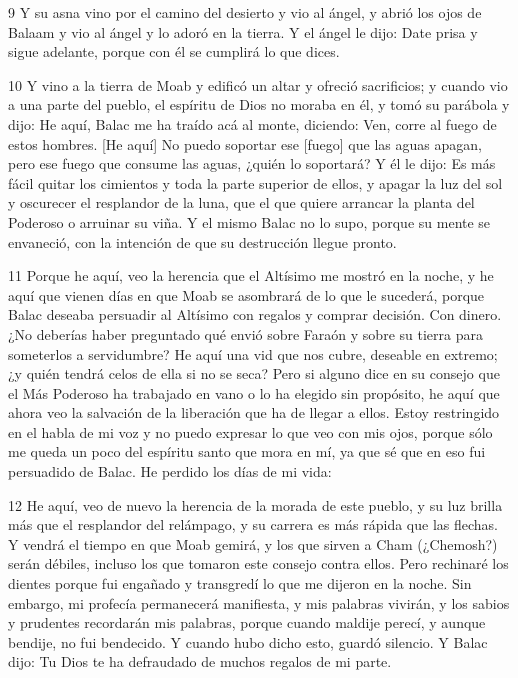\par 9 Y su asna vino por el camino del desierto y vio al ángel, y abrió los ojos de Balaam y vio al ángel y lo adoró en la tierra. Y el ángel le dijo: Date prisa y sigue adelante, porque con él se cumplirá lo que dices.

\par 10 Y vino a la tierra de Moab y edificó un altar y ofreció sacrificios; y cuando vio a una parte del pueblo, el espíritu de Dios no moraba en él, y tomó su parábola y dijo: He aquí, Balac me ha traído acá al monte, diciendo: Ven, corre al fuego de estos hombres. [He aquí] No puedo soportar ese [fuego] que las aguas apagan, pero ese fuego que consume las aguas, ¿quién lo soportará? Y él le dijo: Es más fácil quitar los cimientos y toda la parte superior de ellos, y apagar la luz del sol y oscurecer el resplandor de la luna, que el que quiere arrancar la planta del Poderoso o arruinar su viña. Y el mismo Balac no lo supo, porque su mente se envaneció, con la intención de que su destrucción llegue pronto.

\par 11 Porque he aquí, veo la herencia que el Altísimo me mostró en la noche, y he aquí que vienen días en que Moab se asombrará de lo que le sucederá, porque Balac deseaba persuadir al Altísimo con regalos y comprar decisión. Con dinero. ¿No deberías haber preguntado qué envió sobre Faraón y sobre su tierra para someterlos a servidumbre? He aquí una vid que nos cubre, deseable en extremo; ¿y quién tendrá celos de ella si no se seca? Pero si alguno dice en su consejo que el Más Poderoso ha trabajado en vano o lo ha elegido sin propósito, he aquí que ahora veo la salvación de la liberación que ha de llegar a ellos. Estoy restringido en el habla de mi voz y no puedo expresar lo que veo con mis ojos, porque sólo me queda un poco del espíritu santo que mora en mí, ya que sé que en eso fui persuadido de Balac. He perdido los días de mi vida:

\par 12 He aquí, veo de nuevo la herencia de la morada de este pueblo, y su luz brilla más que el resplandor del relámpago, y su carrera es más rápida que las flechas. Y vendrá el tiempo en que Moab gemirá, y los que sirven a Cham (¿Chemosh?) serán débiles, incluso los que tomaron este consejo contra ellos. Pero rechinaré los dientes porque fui engañado y transgredí lo que me dijeron en la noche. Sin embargo, mi profecía permanecerá manifiesta, y mis palabras vivirán, y los sabios y prudentes recordarán mis palabras, porque cuando maldije perecí, y aunque bendije, no fui bendecido. Y cuando hubo dicho esto, guardó silencio. Y Balac dijo: Tu Dios te ha defraudado de muchos regalos de mi parte.

